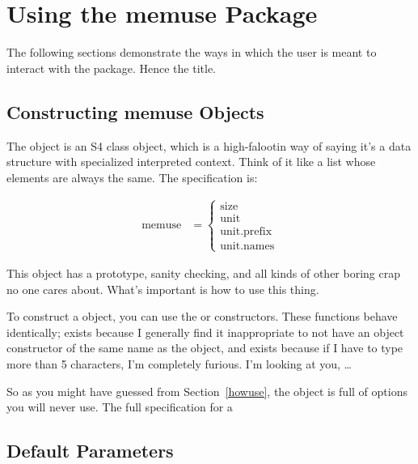 \section{Using the memuse Package}

The following sections demonstrate the ways in which the user is meant to interact with the  package.  Hence the title.


\subsection{Constructing memuse Objects}

The  object is an S4 class object, which is a high-falootin way of saying it's a data structure with specialized interpreted context.  Think of it like a list whose elements are always the same.  The specification is:

\begin{align*}
  \text{memuse} &= 
  \begin{cases}
    \text{size}\\
    \text{unit}\\
    \text{unit.prefix}\\
    \text{unit.names}
  \end{cases}
\end{align*}

This object has a prototype, sanity checking, and all kinds of other boring crap no one cares about.  What's important is how to use this thing.

To construct a  object, you can use the  or  constructors.  These functions behave identically;  exists because I generally find it inappropriate to not have an object constructor of the same name as the object, and  exists because if I have to type more than 5 characters, I'm completely furious.  I'm looking at you, \dots

So as you might have guessed from Section~\ref{howuse}, the  object is full of options you will never use.  The full specification for a 


\subsection{Default Parameters}

